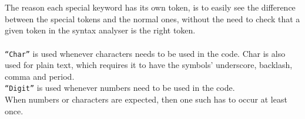 \\ \\
The reason each special keyword has its own token, is to easily see the difference between the special tokens and the normal ones, without the need to check that a given token in the syntax analyser is the right token.
\\ \\
\texttt{``Char''} is used whenever characters needs to be used in the code. Char is also used for plain text, which requires it to have the symbols' underscore, backlash, comma and period. \\
\texttt{``Digit''} is used whenever numbers need to be used in the code. \\
When numbers or characters are expected, then one such has to occur at least once.
